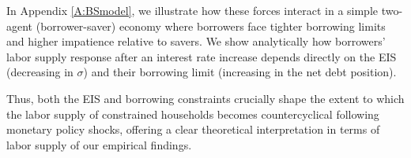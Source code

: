 \documentclass[a4paper,12pt]{article}%
\begin{document}
In Appendix \ref{A:BSmodel}, we illustrate how these forces interact in a simple two-agent (borrower-saver) economy where borrowers face tighter borrowing limits and higher impatience relative to savers. We show analytically how borrowers' labor supply response after an interest rate increase depends directly on the EIS (decreasing in \( \sigma \)) and their borrowing limit (increasing in the net debt position).

Thus, both the EIS and borrowing constraints crucially shape the extent to which the labor supply of constrained households becomes countercyclical following monetary policy shocks, offering a clear theoretical interpretation in terms of labor supply of our empirical findings. 

\end{document}
